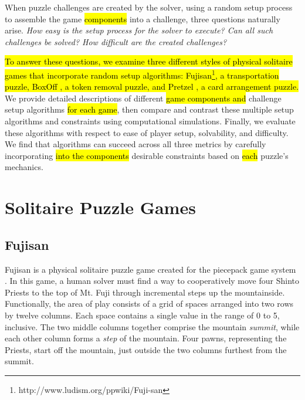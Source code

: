 \documentclass[journal]{IEEEtran}
\begin{document}
When puzzle challenges are created by the solver, using a random setup process to assemble the game \hl{components} into a challenge, three questions naturally arise. {\it How easy is the setup process for the solver to execute? Can all such challenges be solved? How difficult are the created challenges? }

\hl{To answer these questions, we examine three different styles of physical solitaire games that incorporate random setup algorithms: Fujisan\footnote{http://www.ludism.org/ppwiki/Fuji-san}, a transportation puzzle, BoxOff \cite{BoxOffGAMES}, a token removal puzzle, and Pretzel \cite{PretzelMath}, a card arrangement puzzle.} We provide detailed descriptions of different \hl{game components and} challenge setup algorithms \hl{for each game}, then compare and contrast these multiple setup algorithms and constraints using computational simulations. Finally, we evaluate these algorithms with respect to ease of player setup, solvability, and difficulty. We find that algorithms can succeed across all three metrics by carefully incorporating \hl{into the components} desirable constraints based on \hl{each} puzzle's mechanics. 


\section{Solitaire Puzzle Games}

\subsection{Fujisan}

Fujisan is a physical solitaire puzzle game created for the piecepack game system \cite{GAMESYSTEM}. In this game, a human solver must find a way to cooperatively move four Shinto Priests to the top of Mt. Fuji through incremental steps up the mountainside. Functionally, the area of play consists of a grid of spaces arranged into two rows by twelve columns. Each space contains a single value in the range of 0 to 5, inclusive. The two middle columns together comprise the mountain {\it summit}, while each other column forms a {\it step} of the mountain. Four pawns, representing the Priests, start off the mountain, just outside the two columns furthest from the summit.
\end{document}
